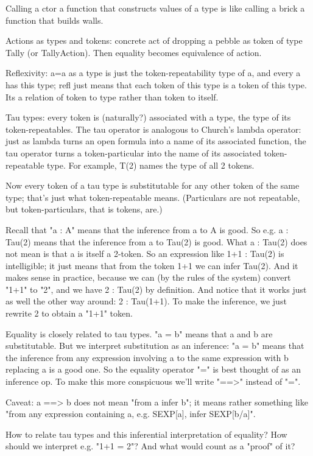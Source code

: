 \documentclass{article}
\begin{document}
Calling a ctor a function that constructs values of a type is like
calling a brick a function that builds walls.

Actions as types and tokens: concrete act of dropping a pebble as
token of type Tally (or TallyAction).  Then equality becomes
equivalence of action.

Reflexivity: a=a as a type is just the token-repeatability type of a,
and every a has this type; refl just means that each token of this type
is a token of this type.  Its a relation of token to type rather than
token to itself.

Tau types: every token is (naturally?) associated with a type, the
type of its token-repeatables.  The tau operator is analogous to
Church's lambda operator: just as lambda turns an open formula into a
name of its associated function, the tau operator turns a
token-particular into the name of its associated token-repeatable
type.  For example, T(2) names the type of all 2 tokens.

Now every token of a tau type is substitutable for any other token of
the same type; that's just what token-repeatable means.  (Particulars
are not repeatable, but token-particulars, that is tokens, are.)

Recall that "a : A" means that the inference from a to A is good.  So
e.g. a : Tau(2) means that the inference from a to Tau(2) is good.
What a : Tau(2) does not mean is that a is itself a 2-token.  So an
expression like 1+1 : Tau(2) is intelligible; it just means that from
the token 1+1 we can infer Tau(2).  And it makes sense in practice,
because we can (by the rules of the system) convert "1+1" to "2", and
we have 2 : Tau(2) by definition.  And notice that it works just as
well the other way around: 2 : Tau(1+1).  To make the inference, we
just rewrite 2 to obtain a "1+1" token.

Equality is closely related to tau types.  "a = b" means that a and b
are substitutable.  But we interpret substitution as an inference: "a
= b" means that the inference from any expression involving a to the
same expression with b replacing a is a good one.  So the equality
operator "=" is best thought of as an inference op.  To make this more
conspicuous we'll write "==>" instead of "=".

Caveat: a ==> b does not mean "from a infer b"; it means rather
something like "from any expression containing a, e.g. SEXP[a], infer
SEXP[b/a]".

How to relate tau types and this inferential interpretation of
equality?  How should we interpret e.g. "1+1 = 2"?  And what would
count as a "proof" of it?
\end{document}
